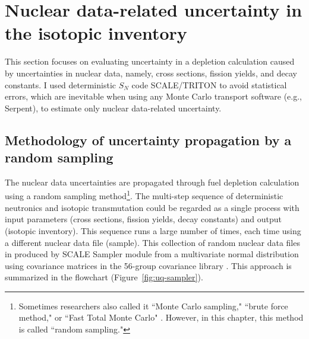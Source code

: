 \section{Nuclear data-related uncertainty in the isotopic inventory}
This section focuses on evaluating uncertainty in a depletion calculation 
caused by uncertainties in nuclear data, namely, cross sections, fission 
yields, and decay constants. I used deterministic $S_N$ code SCALE/TRITON 
\cite{rearden_scale_2018} to avoid statistical errors, which are inevitable 
when using any Monte Carlo transport software (e.g., Serpent), to estimate 
only nuclear data-related uncertainty.

\subsection{Methodology of uncertainty propagation by a random sampling}
The nuclear data uncertainties are propagated through fuel depletion 
calculation using a random sampling method\footnote{Sometimes researchers also 
called it ``Monte Carlo sampling," \cite{radaideh_using_2019-1} ``brute 
force method,"\cite{garcia-herranz_propagation_2008} or ``Fast Total Monte 
Carlo" \cite{rochman_nuclear_2014}. However, in this chapter, this method is 
called ``random  sampling."}. The multi-step sequence of deterministic 
neutronics and isotopic transmutation could be regarded as a single 
process with input parameters (cross sections, fission yields, decay 
constants) and output (isotopic inventory). This sequence runs a 
large number of times, each time using
a different nuclear data file (sample). 
This
collection of random nuclear data files in produced by
SCALE Sampler 
module from a multivariate normal distribution using covariance matrices in 
the 56-group covariance library \cite{rearden_scale_2018, 
radaideh_novel_2019-1}. This approach is summarized in the flowchart 
(Figure~\ref{fig:uq-sampler}).

